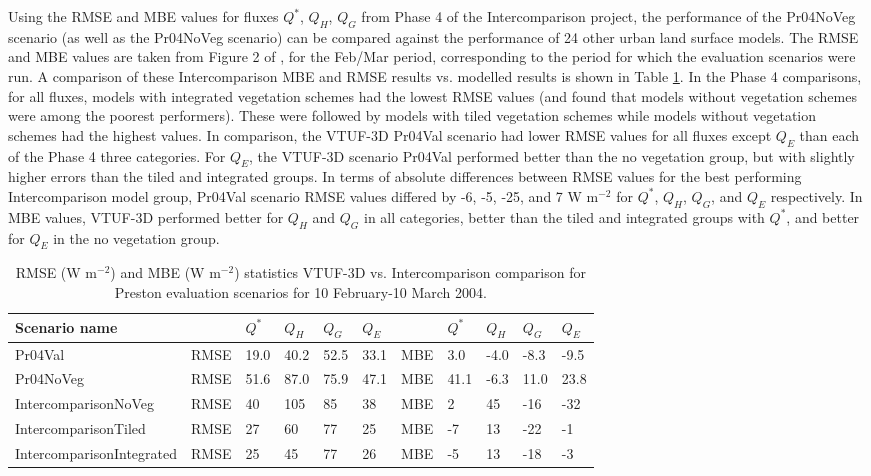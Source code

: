\documentclass[final,3p,times,authoryear]{elsarticle}
\begin{document}
Using the RMSE and MBE values for fluxes $Q^{*}$, $Q_{H}$, $Q_{G}$ from Phase 4 of the Intercomparison project, the performance of the Pr04NoVeg scenario (as well as the Pr04NoVeg scenario) can be compared against the performance of 24 other urban land surface models. The RMSE and MBE values are taken from Figure 2 of \cite{Best2012}, for the Feb/Mar period, corresponding to the period for which the evaluation scenarios were run. A comparison of these Intercomparison MBE and RMSE results vs. modelled results is shown in Table \ref{fig:prestonrmse}. In the Phase 4 comparisons, for all fluxes, models with integrated vegetation schemes had the lowest RMSE values (and \cite{Grimmond2011} found that models without vegetation schemes were among the poorest performers). These were followed by models with tiled vegetation schemes while models without vegetation schemes had the highest values. In comparison, the VTUF-3D Pr04Val scenario had lower RMSE values for all fluxes except $Q_{E}$ than each of the Phase 4 three categories. For $Q_{E}$, the VTUF-3D scenario Pr04Val performed better than the no vegetation group, but with slightly higher errors than the tiled and integrated groups. In terms of absolute differences between RMSE values for the best performing Intercomparison model group, Pr04Val scenario RMSE values differed by -6, -5, -25, and 7 W m$^{-2}$ for $Q^{*}$, $Q_{H}$, $Q_{G}$, and $Q_{E}$ respectively. In MBE values, VTUF-3D performed better for $Q_{H}$ and $Q_{G}$ in all categories, better than the tiled and integrated groups with $Q^{*}$, and better for $Q_{E}$ in the no vegetation group.


 \begin{center}
 \begin{table}[!htbp]
 \caption{RMSE (W m$^{-2}$) and MBE (W m$^{-2}$) statistics VTUF-3D vs. Intercomparison \citep{Best2012} comparison for Preston evaluation scenarios for 10 February-10 March 2004.\label{fig:prestonrmse}} 
 \begin{tabular}{  | l | l | l|l|l|l|l|l|l|l|l| } 
 \hline \textbf{Scenario name}& &\textbf{$Q^{*}$}& \textbf{$Q_{H}$}& \textbf{$Q_{G}$}& \textbf{$Q_{E}$} & &\textbf{$Q^{*}$}& \textbf{$Q_{H}$}& \textbf{$Q_{G}$}& \textbf{$Q_{E}$}  \\ \hline
 Pr04Val& RMSE & 19.0&	40.2&	52.5&	33.1    & MBE & 3.0&	-4.0&	-8.3&	-9.5    \\ \hline
 Pr04NoVeg& RMSE & 51.6&	87.0&	75.9&	47.1  & MBE & 41.1&	-6.3&	11.0&	23.8  \\ \hline
 IntercomparisonNoVeg& RMSE & 40&	105&	85&	38   & MBE & 2&	45&	-16& -32   \\ \hline
 IntercomparisonTiled& RMSE &  27&	60&	77&	25 & MBE & -7&	13&	-22& -1  \\ \hline
 IntercomparisonIntegrated& RMSE & 25&	45&	77&	26   & MBE & -5&	13&	-18& -3   \\ \hline
   \end{tabular} 
 \end{table}
 \end{center} 
 
\end{document}
